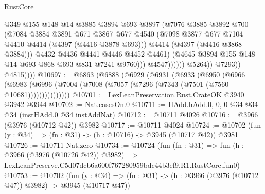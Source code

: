 \begin{lexlean}{RustCore}
\begin{coremodule}
                                    @349
                                    @155
                                    @148
                                    @14
                                    @3885
                                    @3894
                                    @693
                                    @3897
                                    (@7076
                                      @3885
                                      @3892
                                      @700
                                      (@7084
                                        @3884
                                        @3891
                                        @671
                                        @3867
                                        @677
                                        @4540
                                        (@7098
                                          @3877
                                          @677
                                          @7104
                                          @4410
                                          @4414
                                          (@4397 (@4416 @3878 @693)))
                                        @4414
                                        (@4397 (@4416 @3868 @3884)))
                                      @4432
                                      @4436
                                      @4441
                                      @4446
                                      @4452
                                      @4461)
                                    (@4645 @3894 @155 @148 @14 @693 @868 @693 @831 @7241 @9760)))
                                @4547))))))
                    @5264))
                @7293))
            @4815))))
@10697 := @6863
    (@6888
      (@6929
        (@6931
          (@6933
            (@6950
              (@6966
                (@6983 (@6996 (@7004 (@7008 (@7057 (@7296 (@7343 (@7501 (@7560 @10681)))))))))))))))
@10701 := LexLeanPreservation.Rust.CrateOK @3940 @3942 @3944
@10702 := Nat.casesOn.{0}
@10711 := HAdd.hAdd.{0, 0, 0} @34 @34 @34 (instHAdd.{0} @34 instAddNat)
@10712 := @10711 @4026
@10716 := @3966 (@3976 (@10712 @42)) @3982
@10717 := @10711 @4024
@10724 := @10702 (fun (y : @34) => (fn : @31) -> (h : @10716) -> @3945 (@10717 @42)) @3981
@10726 := @10711 Nat.zero
@10734 := @10724
    (fun (fn : @31) =>
    fun (h : @3966 (@3976 (@10726 @42)) @3982) =>
    LexLeanPreserve.C5d07dcb6a600f767280959bdc44b3ef9.R1.RustCore.fun0)
@10753 := @10702
    (fun (y : @34) => (fn : @31) -> (h : @3966 (@3976 (@10712 @47)) @3982) -> @3945 (@10717 @47))

\end{coremodule}
\end{lexlean}
